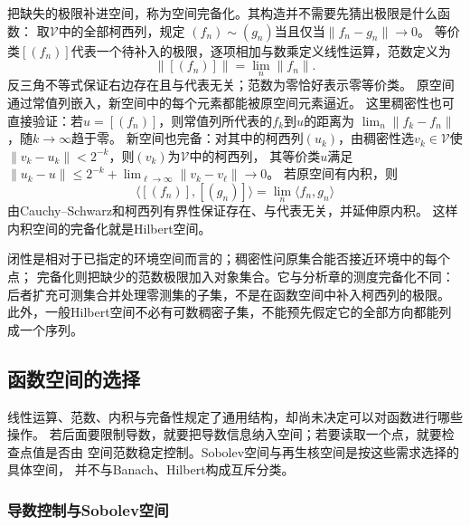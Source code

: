 把缺失的极限补进空间，称为空间完备化。其构造并不需要先猜出极限是什么函数：
取$\mathcal V$中的全部柯西列，规定
$(f_n)\sim(g_n)$当且仅当$\lVert f_n-g_n\rVert\to0$。
等价类$[(f_n)]$代表一个待补入的极限，逐项相加与数乘定义线性运算，范数定义为
\[
 \bigl\lVert[(f_n)]\bigr\rVert=\lim_n\lVert f_n\rVert.
\]
反三角不等式保证右边存在且与代表无关；范数为零恰好表示零等价类。
原空间通过常值列嵌入，新空间中的每个元素都能被原空间元素逼近。
这里稠密性也可直接验证：若$u=[(f_n)]$，则常值列所代表的$f_k$到$u$的距离为
$\lim_n\lVert f_k-f_n\rVert$，随$k\to\infty$趋于零。
新空间也完备：对其中的柯西列$(u_k)$，由稠密性选$v_k\in\mathcal V$使
$\lVert v_k-u_k\rVert<2^{-k}$，则$(v_k)$为$\mathcal V$中的柯西列，
其等价类$u$满足
$\lVert u_k-u\rVert\leq2^{-k}+\lim_{\ell\to\infty}\lVert v_k-v_\ell\rVert\to0$。
若原空间有内积，则
\[
 \bigl\langle[(f_n)],[(g_n)]\bigr\rangle
 =\lim_n\langle f_n,g_n\rangle
\]
由Cauchy--Schwarz和柯西列有界性保证存在、与代表无关，并延伸原内积。
这样内积空间的完备化就是Hilbert空间。

闭性是相对于已指定的环境空间而言的；稠密性问原集合能否接近环境中的每个点；
完备化则把缺少的范数极限加入对象集合。它与分析章的测度完备化不同：
后者扩充可测集合并处理零测集的子集，不是在函数空间中补入柯西列的极限。
此外，一般Hilbert空间不必有可数稠密子集，不能预先假定它的全部方向都能列成一个序列。

\subsection{函数空间的选择}

线性运算、范数、内积与完备性规定了通用结构，却尚未决定可以对函数进行哪些操作。
若后面要限制导数，就要把导数信息纳入空间；若要读取一个点，就要检查点值是否由
空间范数稳定控制。Sobolev空间与再生核空间是按这些需求选择的具体空间，
并不与Banach、Hilbert构成互斥分类。

\subsubsection{导数控制与Sobolev空间}

